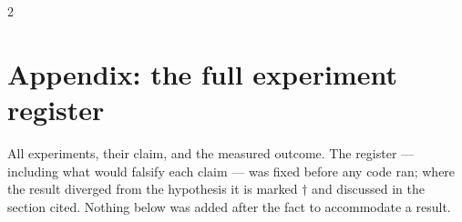 \documentclass[11pt,letterpaper]{article}
\theoremstyle{definition}
\theoremstyle{remark}
\begin{document}
{\scriptsize
\setlength{\bibsep}{0pt plus 0.2ex}
\begin{multicols}{2}


\end{multicols}}


\appendix
\section*{Appendix: the full experiment register}

\noindent All \vExperiments{} experiments, their claim, and the measured outcome. The register
--- including what would falsify each claim --- was fixed before any code ran; where the result
diverged from the hypothesis it is marked $\dagger$ and discussed in the section cited. Nothing
below was added after the fact to accommodate a result.
\end{document}
